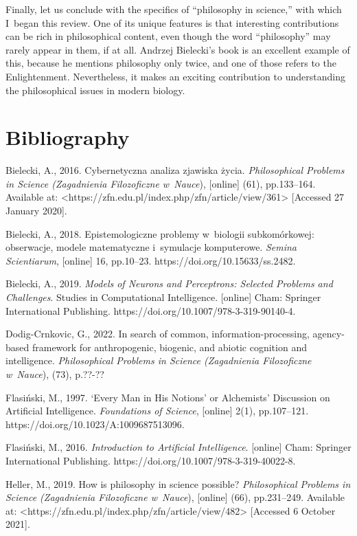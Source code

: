 Finally, let us conclude with the specifics of ``philosophy in science,'' with which I~began this review. One of its unique features is that interesting contributions can be rich in philosophical content, even though the word ``philosophy'' may rarely appear in them, if at all. Andrzej Bielecki's book is an excellent example of this, because he mentions philosophy only twice, and one of those refers to the Enlightenment. Nevertheless, it makes an exciting contribution to understanding the philosophical issues in modern biology.

\section{Bibliography}
Bielecki, A., 2016. Cybernetyczna analiza zjawiska życia. \textit{Philosophical Problems in Science (Zagadnienia Filozoficzne w~Nauce}), [online] (61), pp.133–164. Available at: {\textless}https://zfn.edu.pl/index.php/zfn/article/view/361{\textgreater} [Accessed 27 January 2020].

Bielecki, A., 2018. Epistemologiczne problemy w~biologii subkomórkowej: obserwacje, modele matematyczne i~symulacje komputerowe. \textit{Semina Scientiarum}, [online] 16, pp.10–23. https://doi.org/10.15633/ss.2482.

Bielecki, A., 2019. \textit{Models of Neurons and Perceptrons: Selected Problems and Challenges}. Studies in Computational Intelligence. [online] Cham: Springer International Publishing. https://doi.org/10.1007/978-3-319-90140-4.

Dodig-Crnkovic, G., 2022. In search of common, information-processing, agency-based framework for anthropogenic, biogenic, and abiotic cognition and intelligence. \textit{Philosophical Problems in Science (Zagadnienia Filozoficzne w~Nauce}), (73), p.??-??

Flasiński, M., 1997. ‘Every Man in His Notions' or Alchemists' Discussion on Artificial Intelligence. \textit{Foundations of Science}, [online] 2(1), pp.107–121. https://doi.org/10.1023/A:1009687513096.

Flasiński, M., 2016. \textit{Introduction to Artificial Intelligence}. [online] Cham: Springer International Publishing. https://doi.org/10.1007/978-3-319-40022-8.

Heller, M., 2019. How is philosophy in science possible? \textit{Philosophical Problems in Science (Zagadnienia Filozoficzne w~Nauce}), [online] (66), pp.231–249. Available at: {\textless}https://zfn.edu.pl/index.php/zfn/article/view/482{\textgreater} [Accessed 6 October 2021].

